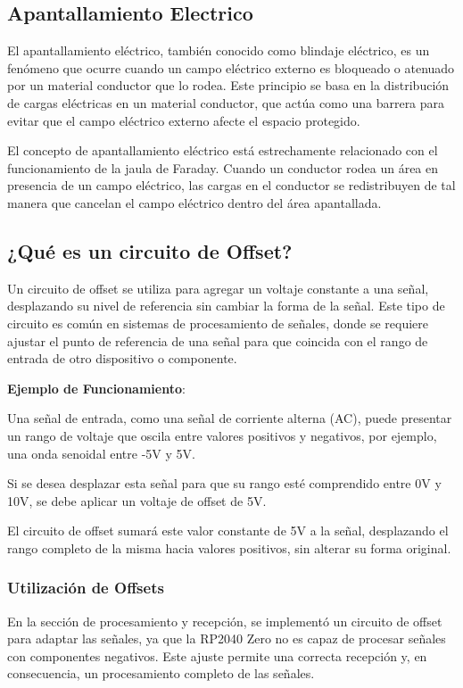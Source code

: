 \documentclass{article}
\begin{document}
\subsection{Apantallamiento Electrico}
El apantallamiento eléctrico, también conocido como blindaje eléctrico, es un fenómeno que ocurre cuando un campo eléctrico externo es bloqueado o atenuado por un material conductor que lo rodea. Este principio se basa en la distribución de cargas eléctricas en un material conductor, que actúa como una barrera para evitar que el campo eléctrico externo afecte el espacio protegido.

El concepto de apantallamiento eléctrico está estrechamente relacionado con el funcionamiento de la jaula de Faraday. Cuando un conductor rodea un área en presencia de un campo eléctrico, las cargas en el conductor se redistribuyen de tal manera que cancelan el campo eléctrico dentro del área apantallada.

\subsection{¿Qué es un circuito de Offset?}

Un circuito de offset se utiliza para agregar un voltaje constante a una señal, desplazando su nivel de referencia sin cambiar la forma de la señal. Este tipo de circuito es común en sistemas de procesamiento de señales, donde se requiere ajustar el punto de referencia de una señal para que coincida con el rango de entrada de otro dispositivo o componente.

\textbf{Ejemplo de Funcionamiento}:

Una señal de entrada, como una señal de corriente alterna (AC), puede presentar un rango de voltaje que oscila entre valores positivos y negativos, por ejemplo, una onda senoidal entre -5V y 5V.

Si se desea desplazar esta señal para que su rango esté comprendido entre 0V y 10V, se debe aplicar un voltaje de offset de 5V.

El circuito de offset sumará este valor constante de 5V a la señal, desplazando el rango completo de la misma hacia valores positivos, sin alterar su forma original.

\subsubsection{Utilización de Offsets}

En la sección de procesamiento y recepción, se implementó un circuito de offset para adaptar las señales, ya que la RP2040 Zero no es capaz de procesar señales con componentes negativos. Este ajuste permite una correcta recepción y, en consecuencia, un procesamiento completo de las señales.
\end{document}
